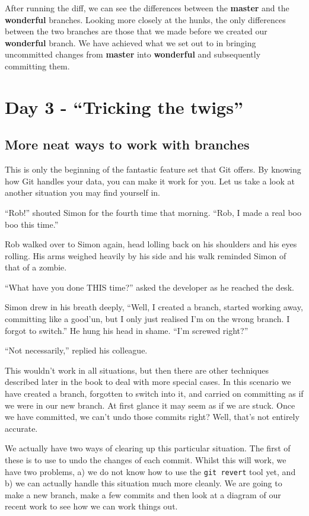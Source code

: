 After running the diff, we can see the differences between the \textbf{master} and the \textbf{wonderful} branches.  Looking more closely at the hunks, the only differences between the two branches are those that we made before we created our \textbf{wonderful} branch.  We have achieved what we set out to in bringing uncommitted changes from \textbf{master} into \textbf{wonderful} and subsequently committing them.

\section{Day 3 - ``Tricking the twigs''}
\subsection{More neat ways to work with branches}

This is only the beginning of the fantastic feature set that Git offers.  By knowing how Git handles your data, you can make it work for you.  Let us take a look at another situation you may find yourself in.

\begin{trenches}
``Rob!'' shouted Simon for the fourth time that morning.  ``Rob, I made a real boo boo this time.''

Rob walked over to Simon again, head lolling back on his shoulders and his eyes rolling.  His arms weighed heavily by his side and his walk reminded Simon of that of a zombie.

``What have you done THIS time?'' asked the developer as he reached the desk.

Simon drew in his breath deeply, ``Well, I created a branch, started working away, committing like a good'un, but I only just realised I'm on the wrong branch.  I forgot to switch.''  He hung his head in shame.  ``I'm screwed right?''

``Not necessarily,'' replied his colleague.
\end{trenches}

This wouldn't work in all situations, but then there are other techniques described later in the book to deal with more special cases.  In this scenario we have created a branch, forgotten to switch into it, and carried on committing as if we were in our new branch.  At first glance it may seem as if we are stuck.  Once we have committed, we can't undo those commits right?  Well, that's not entirely accurate.  

We actually have two ways of clearing up this particular situation.  The first of these is to use  to undo the changes of each commit.  Whilst this will work, we have two problems, a) we do not know how to use the \texttt{git revert} tool yet, and b) we can actually handle this situation much more cleanly.  We are going to make a new branch, make a few commits and then look at a diagram of our recent work to see how we can work things out.

